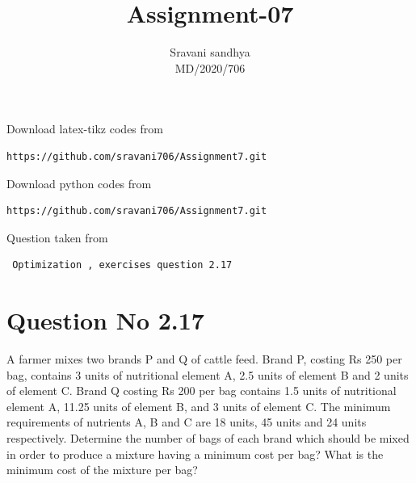 \documentclass[journal,12pt,twocolumn]{IEEEtran}
\begin{document}
\makeatother
\let\StandardTheFigure\thefigure
\let\vec\mathbf
\renewcommand{\thefigure}{\theproblem}
\def\putbox#1#2#3{\makebox[0in][l]{\makebox[#1][l]{}\raisebox{\baselineskip}[0in][0in]{\raisebox{#2}[0in][0in]{#3}}}}
     \def\rightbox#1{\makebox[0in][r]{#1}}
     \def\centbox#1{\makebox[0in]{#1}}
     \def\topbox#1{\raisebox{-\baselineskip}[0in][0in]{#1}}
     \def\midbox#1{\raisebox{-0.5\baselineskip}[0in][0in]{#1}}
\vspace{3cm}
\title{Assignment-07}
\author{Sravani sandhya  \\ MD/2020/706}
\maketitle
\newpage
\bigskip
\renewcommand{\thefigure}{\theenumi}
\renewcommand{\thetable}{\theenumi}
Download latex-tikz codes from
\begin{lstlisting}
https://github.com/sravani706/Assignment7.git
\end{lstlisting}
%
Download python codes from
\begin{lstlisting}
https://github.com/sravani706/Assignment7.git
\end{lstlisting}
%
Question taken from
\begin{lstlisting}
 Optimization , exercises question 2.17
\end{lstlisting}
\section{Question No 2.17}
A farmer mixes two brands P and Q of cattle feed. Brand P, costing Rs 250 per
bag, contains 3 units of nutritional element A, 2.5 units of element B and 2 units
of element C. Brand Q costing Rs 200 per bag contains 1.5 units of nutritional
element A, 11.25 units of element B, and 3 units of element C. The minimum
requirements of nutrients A, B and C are 18 units, 45 units and 24 units respectively.
Determine the number of bags of each brand which should be mixed in order to
produce a mixture having a minimum cost per bag? What is the minimum cost of
the mixture per bag?\\
\end{document}
